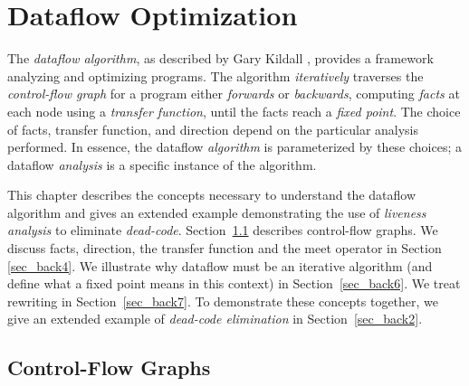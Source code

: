 \documentclass[12pt]{report}
\begin{document}

\renewcommand{\textfraction}{0.1}
\renewcommand{\topfraction}{0.9}

\chapter{Dataflow Optimization}
\label{ref_chapter_background}


The \emph{dataflow algorithm}, as described by Gary Kildall
\citep{Kildall1973}, provides a framework analyzing and optimizing
programs.  The algorithm \emph{iteratively} traverses the
\emph{control-flow graph} for a program either \emph{forwards} or
\emph{backwards}, computing \emph{facts} at each node using a
\emph{transfer function}, until the facts reach a \emph{fixed
  point}. The choice of facts, transfer function, and direction depend
on the particular analysis performed. In essence, the dataflow
\emph{algorithm} is parameterized by these choices; a dataflow
\emph{analysis} is a specific instance of the algorithm.

This chapter describes the concepts necessary to understand the
dataflow algorithm and gives an extended example demonstrating the use
of \emph{liveness analysis} to eliminate
\emph{dead-code}. Section~\ref{sec_back1} describes control-flow
graphs. We discuss facts, direction, the transfer function and the
meet operator in Section \ref{sec_back4}. We illustrate why dataflow
must be an iterative algorithm (and define what a fixed point means in
this context) in Section~\ref{sec_back6}. We treat rewriting in
Section~\ref{sec_back7}. To demonstrate these concepts together, we
give an extended example of \emph{dead-code elimination} in
Section~\ref{sec_back2}.

\section{Control-Flow Graphs}
\label{sec_back1}

\end{document}
